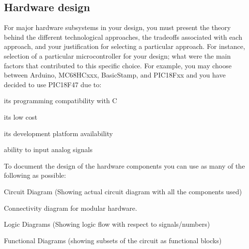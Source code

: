 \documentclass[../main.tex]{subfiles}
\begin{document}
\subsection{Hardware design}

\begin{newrequirements}
    \begin{todolist}
        \item[\done] For major hardware subsystems in your 
            design, you must present the theory 
            behind the different technological 
            approaches, the tradeoffs associated 
            with each approach, and your 
            justification for selecting a 
            particular approach. For instance, 
            selection of a particular 
            microcontroller for your design; what 
            were the main factors that contributed 
            to this specific choice. For example, 
            you may choose between Arduino, 
            MC68HCxxx, BasicStamp, and PIC18Fxx and 
            you have decided to use PIC18F47 due 
            to: 

        \begin{todolist}
        \item its programming compatibility with C 

        \item [\done] its low cost 

        \item [\done] its development platform availability 

        \item ability to input analog signals 
        \end{todolist}

        \item To document the design of the hardware 
        components you can use as many of the 
        following as possible: 

        \begin{todolist}
        \item Circuit Diagram (Showing actual circuit 
        diagram with all the components used) 

        \item [\done] Connectivity diagram for modular 
        hardware. 

        \item Logic Diagrams (Showing logic flow with 
        respect to signals/numbers) 

        \item Functional Diagrams (showing subsets of 
        the circuit as functional blocks) 


\end{todolist}
\end{todolist}
\end{newrequirements}
\end{document}
